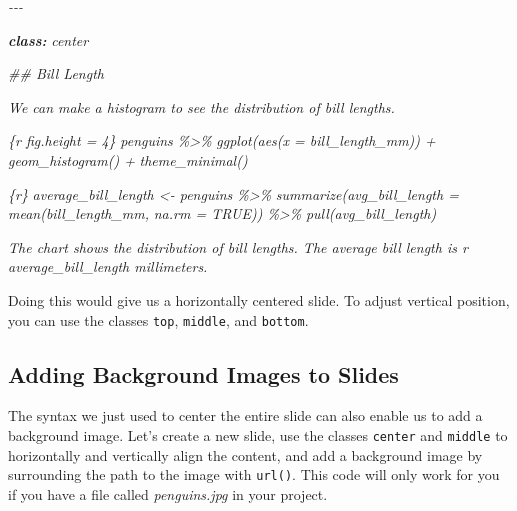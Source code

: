 \documentclass[
]{book}
\newenvironment{Shaded}{\begin{snugshade}}{\end{snugshade}}
\newcommand{\AnnotationTok}[1]{\textcolor[rgb]{0.56,0.35,0.01}{\textbf{\textit{#1}}}}
\newcommand{\CommentTok}[1]{\textcolor[rgb]{0.56,0.35,0.01}{\textit{#1}}}
\begin{document}
\begin{Shaded}
\begin{Highlighting}[]
\CommentTok{{-}{-}{-}}

\AnnotationTok{class:}\CommentTok{ center}

\CommentTok{\#\# Bill Length}

\CommentTok{We can make a histogram to see the distribution of bill lengths.}

\CommentTok{\textasciigrave{}\textasciigrave{}\textasciigrave{}\{r fig.height = 4\}}
\CommentTok{penguins \%\textgreater{}\% }
\CommentTok{  ggplot(aes(x = bill\_length\_mm)) +}
\CommentTok{  geom\_histogram() +}
\CommentTok{  theme\_minimal()}
\CommentTok{\textasciigrave{}\textasciigrave{}\textasciigrave{}}

\CommentTok{\textasciigrave{}\textasciigrave{}\textasciigrave{}\{r\}}
\CommentTok{average\_bill\_length \textless{}{-} penguins \%\textgreater{}\% }
\CommentTok{  summarize(avg\_bill\_length = mean(bill\_length\_mm,}
\CommentTok{                                   na.rm = TRUE)) \%\textgreater{}\% }
\CommentTok{  pull(avg\_bill\_length)}
\CommentTok{\textasciigrave{}\textasciigrave{}\textasciigrave{}}

\CommentTok{The chart shows the distribution of bill lengths. The average bill length is \textasciigrave{}r average\_bill\_length\textasciigrave{} millimeters.}
\end{Highlighting}
\end{Shaded}

Doing this would give us a horizontally centered slide. To adjust vertical position, you can use the classes \texttt{top}, \texttt{middle}, and \texttt{bottom}.

\hypertarget{adding-background-images-to-slides}{%
\subsection*{Adding Background Images to Slides}\label{adding-background-images-to-slides}}

The syntax we just used to center the entire slide can also enable us to add a background image. Let's create a new slide, use the classes \texttt{center} and \texttt{middle} to horizontally and vertically align the content, and add a background image by surrounding the path to the image with \texttt{url()}. This code will only work for you if you have a file called \emph{penguins.jpg} in your project.
\end{document}
